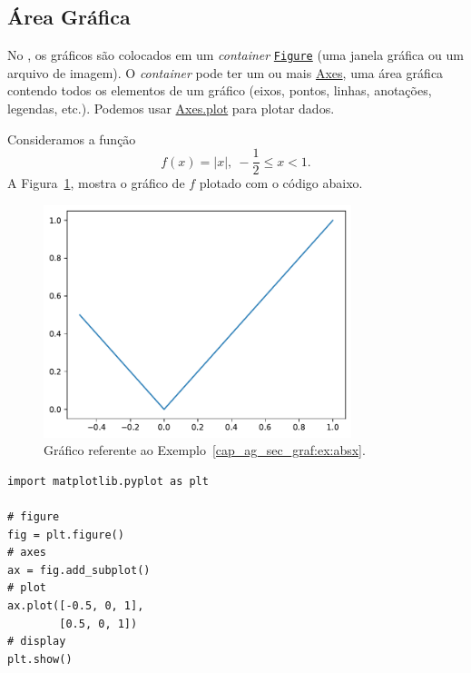 \subsection{Área Gráfica}

No {\matplotlib}, os gráficos são colocados em um \textit{container} \href{https://matplotlib.org/stable/api/figure_api.html#matplotlib.figure.Figure}{\lstinline+Figure+} (uma janela gráfica ou um arquivo de imagem). O \textit{container} pode ter um ou mais \href{https://matplotlib.org/stable/api/_as_gen/matplotlib.axes.Axes.html#matplotlib.axes.Axes}{Axes}, uma área gráfica contendo todos os elementos de um gráfico (eixos, pontos, linhas, anotações, legendas, etc.). Podemos usar \href{https://matplotlib.org/stable/api/_as_gen/matplotlib.axes.Axes.plot.html#matplotlib.axes.Axes.plot}{Axes.plot} para plotar dados.

\begin{ex}\label{cap_ag_sec_graf:ex:absx}
  Consideramos a função
  \begin{equation}
    f(x) = |x|, ~-\frac{1}{2}\leq x < 1.
  \end{equation}
  A Figura~\ref{cap_ag_sec_graf:fig:absx}, mostra o gráfico de $f$ plotado com o código abaixo.

  \begin{figure}[H]
    \centering
    \includegraphics[width=0.8\textwidth]{./cap_ag/dados/fig_absx/fig}
    \caption{Gráfico referente ao Exemplo~\ref{cap_ag_sec_graf:ex:absx}.}
    \label{cap_ag_sec_graf:fig:absx}
  \end{figure}
  
\begin{lstlisting}
import matplotlib.pyplot as plt

# figure
fig = plt.figure()
# axes
ax = fig.add_subplot()
# plot
ax.plot([-0.5, 0, 1],
        [0.5, 0, 1])
# display
plt.show()
\end{lstlisting}

\end{ex}

